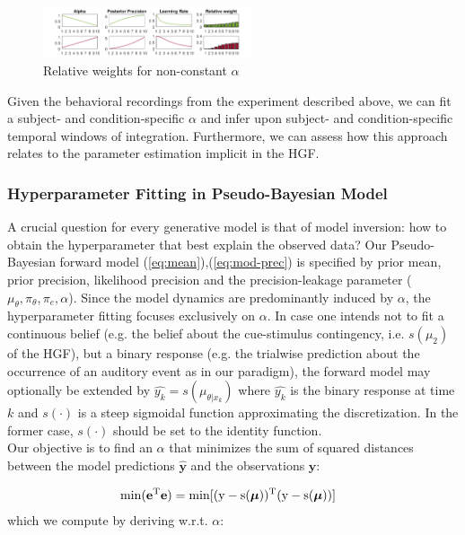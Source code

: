 \documentclass{article}
\begin{document}
\begin{multicols}{2}
\begin{figure}[H]
\hspace{-8mm}
\includegraphics[width=0.55\textwidth]{alpha_variable.PNG}
\caption{Relative weights for non-constant $\alpha$}
  \label{fig:alpha-nonconst}
\end{figure}

Given the behavioral recordings from the experiment described above, we can fit a subject- and condition-specific $\alpha$ and infer upon subject- and condition-specific temporal windows of integration. Furthermore, we can assess how this approach relates to the parameter estimation implicit in the HGF. \\

\subsubsection*{Hyperparameter Fitting in Pseudo-Bayesian Model}
A crucial question for every generative model is that of model inversion: how to obtain the hyperparameter that best explain the observed data? Our Pseudo-Bayesian forward model  (\ref{eq:mean}),(\ref{eq:mod-prec}) is specified by prior mean, prior precision, likelihood precision and the precision-leakage parameter ($\mu_\theta, \pi_\theta, \pi_e, \alpha$). Since the model dynamics are predominantly induced by $\alpha$, the hyperparameter fitting focuses exclusively on $\alpha$. In case one intends not to fit a continuous belief (e.g. the belief about the cue-stimulus contingency, i.e. $s(\mu_2)$ of the HGF), but a binary response (e.g. the trialwise prediction about the occurrence of an auditory event as in our paradigm), the forward model may optionally be extended by $\hat{y_k} = s(\mu_{\theta|x_k})$ where $\hat{y_k}$ is the binary response at time $k$ and $s(\cdot)$ is a steep sigmoidal function approximating the discretization. In the former case, $s(\cdot)$ should be set to the identity function. \\
Our objective is to find an $\alpha$ that minimizes the sum of squared distances between the model predictions $\hat{\bm{y}}$ and the observations $\bm{y}$:

\begin{align} \label{eq:obj}
&\rm \min(\mathbf{e}^T \mathbf{e}) = \min[(\boldsymbol{y} - s(\boldsymbol{\mu}))^T (\boldsymbol{y} - s(\boldsymbol{\mu}))]
\end{align}
which we compute by deriving w.r.t. $\alpha$:


\end{multicols}
\end{document}
